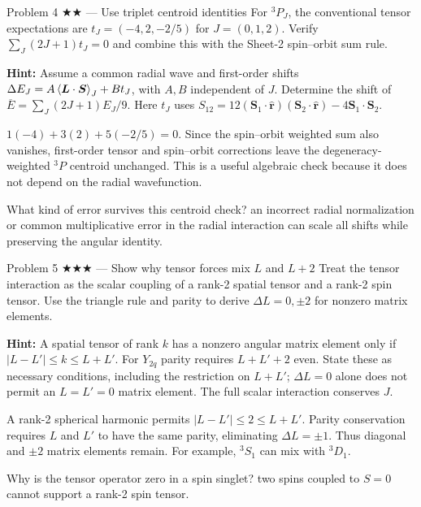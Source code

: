 \documentclass[11pt]{article}
\begin{document}
\begin{problem}{Problem 4 ★★ — Use triplet centroid identities}
For $^3P_J$, the conventional tensor expectations are
$t_J=(-4,2,-2/5)$ for $J=(0,1,2)$. Verify
$\sum_J(2J+1)t_J=0$ and combine this with the Sheet-2 spin--orbit sum rule.

\textbf{Hint:} Assume a common radial wave and first-order shifts
$\Delta E_J=A\left\langle \bm L\cdot\bm S\right\rangle_J+Bt_J$, with $A,B$ independent
of $J$. Determine the shift of $\overline E=\sum_J(2J+1)E_J/9$.
Here $t_J$ uses $S_{12}=12(\bm S_1\cdot\widehat{\bm r})
(\bm S_2\cdot\widehat{\bm r})-4\bm S_1\cdot\bm S_2$.
\end{problem}
\begin{solution}
$1(-4)+3(2)+5(-2/5)=0$. Since the spin--orbit weighted sum also vanishes,
first-order tensor and spin--orbit corrections leave the degeneracy-weighted
$^3P$ centroid unchanged. This is a useful algebraic check because it does not
depend on the radial wavefunction.
\end{solution}
\begin{quiz}
What kind of error survives this centroid check? \answer an incorrect radial
normalization or common multiplicative error in the radial interaction can
scale all shifts while preserving the angular identity.
\end{quiz}

\begin{problem}{Problem 5 ★★★ — Show why tensor forces mix $L$ and $L+2$}
Treat the tensor interaction as the scalar coupling of a rank-2 spatial tensor
and a rank-2 spin tensor. Use the triangle rule and parity to derive
$\Delta L=0,\pm2$ for nonzero matrix elements.

\textbf{Hint:} A spatial tensor of rank $k$ has a nonzero angular matrix
element only if $|L-L'|\le k\le L+L'$. For $Y_{2q}$ parity requires
$L+L'+2$ even. State these as necessary conditions, including the restriction
on $L+L'$; $\Delta L=0$ alone does not permit an $L=L'=0$ matrix element.
The full scalar interaction conserves $J$.
\end{problem}
\begin{solution}
A rank-2 spherical harmonic permits $|L-L'|\le2\le L+L'$. Parity conservation
requires $L$ and $L'$ to have the same parity, eliminating $\Delta L=\pm1$.
Thus diagonal and $\pm2$ matrix elements remain. For example, $^3S_1$ can mix
with $^3D_1$.
\end{solution}
\begin{quiz}
Why is the tensor operator zero in a spin singlet? \answer two spins coupled to
$S=0$ cannot support a rank-2 spin tensor.
\end{quiz}
\end{document}
